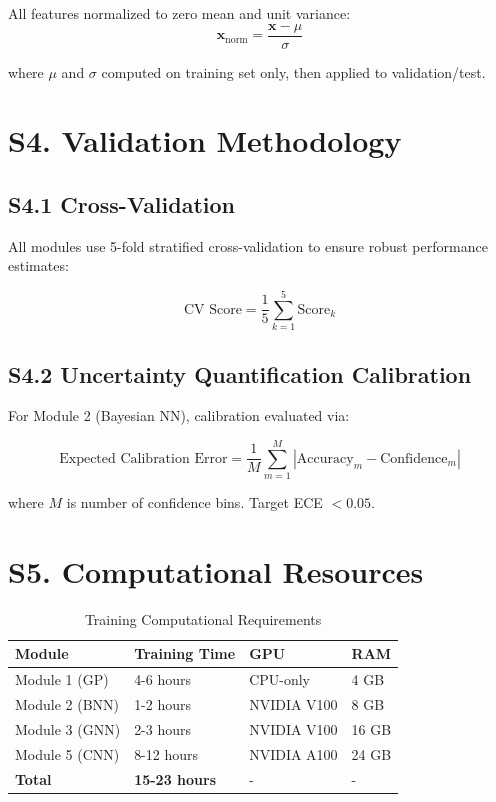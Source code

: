 \documentclass[11pt,a4paper]{article}
\begin{document}
All features normalized to zero mean and unit variance:
\[
\mathbf{x}_{\text{norm}} = \frac{\mathbf{x} - \mu}{\sigma}
\]

where $\mu$ and $\sigma$ computed on training set only, then applied to validation/test.

\section{S4. Validation Methodology}

\subsection{S4.1 Cross-Validation}

All modules use 5-fold stratified cross-validation to ensure robust performance estimates:

\[
\text{CV Score} = \frac{1}{5} \sum_{k=1}^{5} \text{Score}_k
\]

\subsection{S4.2 Uncertainty Quantification Calibration}

For Module 2 (Bayesian NN), calibration evaluated via:

\[
\text{Expected Calibration Error} = \frac{1}{M} \sum_{m=1}^{M} |\text{Accuracy}_m - \text{Confidence}_m|
\]

where $M$ is number of confidence bins. Target ECE $< 0.05$.

\section{S5. Computational Resources}

\begin{table}[H]
\centering
\caption{Training Computational Requirements}
\label{tab:compute}
\begin{tabular}{|l|l|l|l|}
\hline
\textbf{Module} & \textbf{Training Time} & \textbf{GPU} & \textbf{RAM} \\
\hline
Module 1 (GP) & 4-6 hours & CPU-only & 4 GB \\
\hline
Module 2 (BNN) & 1-2 hours & NVIDIA V100 & 8 GB \\
\hline
Module 3 (GNN) & 2-3 hours & NVIDIA V100 & 16 GB \\
\hline
Module 5 (CNN) & 8-12 hours & NVIDIA A100 & 24 GB \\
\hline
\textbf{Total} & \textbf{15-23 hours} & - & - \\
\hline
\end{tabular}
\end{table}
\end{document}
